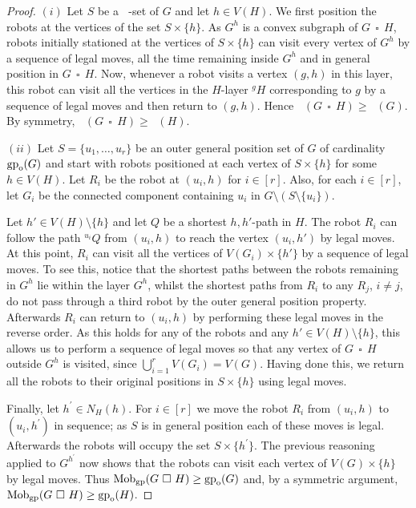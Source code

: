 \documentclass[a4paper,12pt]{article}
\DeclareMathOperator{\mob}{Mob_{gp}}
\DeclareMathOperator{\gp}{gp}
\DeclareMathOperator{\cp}{\,\square\,}
\newcommand{\gpo}{\gp_{\rm o}}
\theoremstyle{definition}
\begin{document}
	\begin{proof}
		$(i)$ Let $S$ be a $\mob$-set of $G$ and let $h\in V(H)$. We first position the robots at the vertices of the set $S \times \{ h\}$. As $G^h$ is a convex subgraph of $G \cp H$, robots initially stationed at the vertices of $S \times \{ h\} $ can visit every vertex of $G^h$ by a sequence of legal moves, all the time remaining inside $G^h$ and in general position in $G \cp H$. Now, whenever a robot visits a vertex $(g,h)$ in this layer, this robot can visit all the vertices in the $H$-layer $^gH$ corresponding to $g$ by a sequence of legal moves and then return to $(g,h)$. Hence $\mob(G\cp H) \ge \mob(G)$. By symmetry, $\mob(G\cp H) \ge \mob(H)$. 
		
		$(ii)$ Let $S = \{ u_1,\dots ,u_r\} $ be an outer general position set of $G$ of cardinality $\gpo(G)$ and start with robots positioned at each vertex of $S \times \{ h\} $ for some $h \in V(H)$. Let $R_i$ be the robot at $(u_i, h)$ for $i \in [r]$. Also, for each $i\in [r]$, let $G_i$ be the connected component containing $u_i$ in $G \setminus (S\setminus\{ u_i\} )$. 
		
		Let $h' \in V(H)\setminus\{ h\}$ and let $Q$ be a shortest $h,h'$-path in $H$. The robot $R_i$ can follow the path ${}^{u_i}Q$ from $(u_i,h)$ to reach the vertex $(u_i,h')$ by legal moves. At this point, $R_i$ can visit all the vertices of $V(G_i) \times \{ h' \}$ by a sequence of legal moves. To see this, notice that the shortest paths between the robots remaining in $G^h$ lie within the layer $G^h$, whilst the shortest paths from $R_i$ to any $R_j$, $i \neq j$, do not pass through a third robot by the outer general position property. Afterwards $R_i$ can return to $(u_i,h)$ by performing these legal moves in the reverse order. As this holds for any of the robots and any $h' \in V(H) \setminus \{ h\} $, this allows us to perform a sequence of legal moves so that any vertex of $G \cp H$ outside $G^h$ is visited, since $\bigcup _{i=1}^{r}V(G_i) = V(G)$. Having done this, we return all the robots to their original positions in $S \times \{ h\} $ using legal moves.
		
		Finally, let $h^{\prime } \in N_H(h)$. For $i\in [r]$ we move the robot $R_i$ from $(u_i,h)$ to $(u_i,h^{\prime })$ in sequence; as $S$ is in general position each of these moves is legal. Afterwards the robots will occupy the set $S \times \{ h^{\prime }\}$. The previous reasoning applied to $G^{h^{\prime }}$ now shows that the robots can visit each vertex of $V(G) \times \{ h\} $ by legal moves. Thus $\mob (G \cp H) \geq \gpo(G)$ and, by a symmetric argument, $\mob (G \cp H) \geq \gpo(H)$.
	\end{proof}
	
\end{document}
